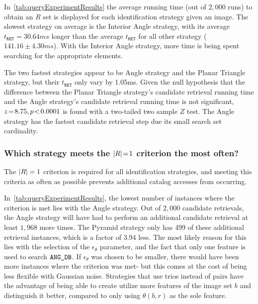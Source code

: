 In~\autoref{tab:queryExperimentResults} the average running time (out of $2{,}000$ runs) to obtain an $R$ set is displayed for each identification strategy given an image.
The slowest strategy on average is the Interior Angle strategy, with its average $t_{\texttt{RET}} = 30.64 \si{ms}$ longer than the average $t_{\texttt{RET}}$ for all other strategy ($141.16 \pm 4.30 \si{ms}$).
With the Interior Angle strategy, more time is being spent searching for the appropriate elements.

The two fastest strategies appear to be Angle strategy and the Planar Triangle strategy, but their $t_\texttt{RET}$ only vary by 1.05ms.
Given the null hypothesis that the difference between the Planar Triangle strategy's candidate retrieval running time and the Angle strategy's candidate retrieval running time is not significant, $z \!=\! 8.75, p\!<\!0.0001$ is found with a two-tailed two sample $Z$ test.
The Angle strategy has the fastest candidate retrieval step due its small search set cardinality.

\subsubsection{Which strategy meets the $\left| R \right| \!=\! 1$ criterion the most often?}
The $\left| R \right| = 1$ criterion is required for all identification strategies, and meeting this criteria as often as possible prevents additional catalog accesses from occurring.

In~\autoref{tab:queryExperimentResults}, the lowest number of instances where the criterion is met lies with the Angle strategy.
Out of $2{,}000$ candidate retrievals, the Angle strategy will have had to perform an additional candidate retrieval at least $1{,}968$ more times.
The Pyramid strategy only has 499 of these additional retrieval instances, which is a factor of 3.94 less.
The most likely reason for this lies with the selection of the $\epsilon_\theta$ parameter, and the fact that only one feature is used to search $\texttt{ANG\_DB}$.
If $\epsilon_\theta$ was chosen to be smaller, there would have been more instances where the criterion was met- but this comes at the cost of being less flexible with Gaussian noise.
Strategies that use trios instead of pairs have the advantage of being able to create utilize more features of the image set $b$ and distinguish it better, compared to only using $\theta(b, r)$ as the sole feature.


